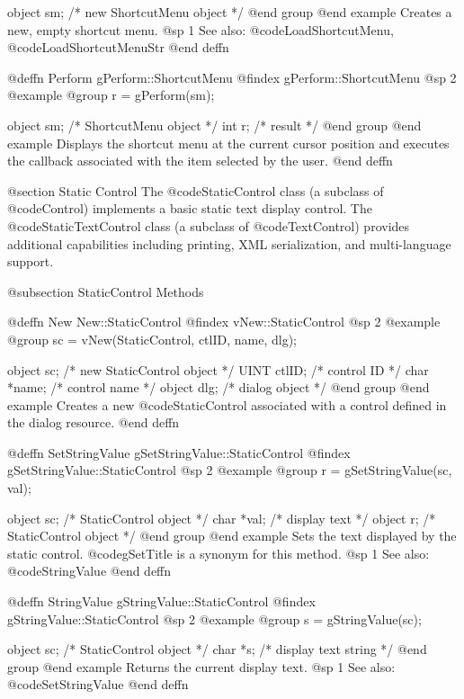 object  sm;   /*  new ShortcutMenu object  */
@end group
@end example
Creates a new, empty shortcut menu.
@sp 1
See also:  @code{LoadShortcutMenu}, @code{LoadShortcutMenuStr}
@end deffn



@deffn {Perform} gPerform::ShortcutMenu
@findex gPerform::ShortcutMenu
@sp 2
@example
@group
r = gPerform(sm);

object  sm;   /*  ShortcutMenu object  */
int     r;    /*  result               */
@end group
@end example
Displays the shortcut menu at the current cursor position and executes
the callback associated with the item selected by the user.
@end deffn




@section Static Control
The @code{StaticControl} class (a subclass of @code{Control}) implements
a basic static text display control.  The @code{StaticTextControl} class
(a subclass of @code{TextControl}) provides additional capabilities
including printing, XML serialization, and multi-language support.

@subsection StaticControl Methods



@deffn {New} New::StaticControl
@findex vNew::StaticControl
@sp 2
@example
@group
sc = vNew(StaticControl, ctlID, name, dlg);

object  sc;       /*  new StaticControl object  */
UINT    ctlID;    /*  control ID                */
char    *name;    /*  control name              */
object  dlg;      /*  dialog object             */
@end group
@end example
Creates a new @code{StaticControl} associated with a control defined in
the dialog resource.
@end deffn



@deffn {SetStringValue} gSetStringValue::StaticControl
@findex gSetStringValue::StaticControl
@sp 2
@example
@group
r = gSetStringValue(sc, val);

object  sc;    /*  StaticControl object  */
char    *val;  /*  display text          */
object  r;     /*  StaticControl object  */
@end group
@end example
Sets the text displayed by the static control.  @code{gSetTitle} is a
synonym for this method.
@sp 1
See also:  @code{StringValue}
@end deffn



@deffn {StringValue} gStringValue::StaticControl
@findex gStringValue::StaticControl
@sp 2
@example
@group
s = gStringValue(sc);

object  sc;   /*  StaticControl object  */
char    *s;   /*  display text string   */
@end group
@end example
Returns the current display text.
@sp 1
See also:  @code{SetStringValue}
@end deffn




